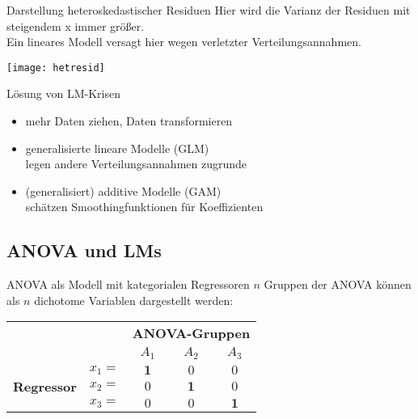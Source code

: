 \begin{frame}
  {Darstellung heteroskedastischer Residuen}
  Hier wird die Varianz der Residuen mit steigendem x immer größer.\\
  Ein lineares Modell versagt hier wegen verletzter Verteilungsannahmen.
  \begin{center}
    \texttt{[image: hetresid]}
  \end{center}
\end{frame}

\begin{frame}
  {Lösung von LM-Krisen}
  \begin{itemize}[<+->]
    \item mehr Daten ziehen, Daten transformieren
      \vspace{0.5cm}
    \item \alert{generalisierte lineare Modelle (GLM)}\\
      legen andere Verteilungsannahmen zugrunde
      \vspace{0.5cm}
    \item (generalisiert) additive Modelle (GAM)\\
      schätzen Smoothingfunktionen für Koeffizienten
  \end{itemize}
\end{frame}

\subsection{ANOVA und LMs}

\begin{frame}
  {ANOVA als Modell mit kategorialen Regressoren}
  $n$ Gruppen der ANOVA können als $n$ dichotome Variablen dargestellt werden:\\
  \vspace{0.5cm}
  \begin{center}
    \begin{tabular}[h!]{|c|c|c|c|c|}
      \cline{3-5}
      \multicolumn{2}{c|}{} & \multicolumn{3}{c|}{\textbf{ANOVA-Gruppen}} \\
      \cline{3-5}
      \multicolumn{2}{c|}{} & $A_1$ & $A_2$ & $A_3$ \\
      \hline
      \multirow{3}{*}{\begin{sideways}\textbf{Regressor}\end{sideways}} & \rule{0px}{18px} $x_1=$ & $\mathbf{1}$ & $0$ & $0$ \\
      \cline{2-5}
      & \rule{0px}{18px} $x_2=$ & $0$ & $\mathbf{1}$ & $0$ \\
      \cline{2-5}
      & \rule{0px}{18px} $x_3=$ & $0$ & $0$ & $\mathbf{1}$ \\
      \hline
    \end{tabular}
  \end{center}
\end{frame}

